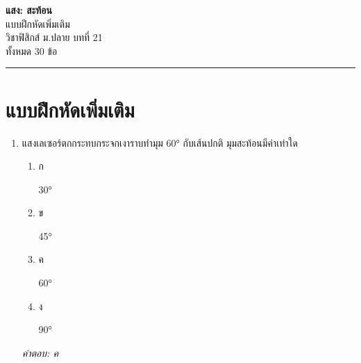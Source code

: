 \documentclass[12pt]{article}
\begin{document}
\begin{center}
{\Large\textbf{แสง: สะท้อน}}\\[6pt]
{\normalsize แบบฝึกหัดเพิ่มเติม}\\[6pt]
{\normalsize วิชาฟิสิกส์ ม.ปลาย บทที่ 21}\\[4pt]
{\footnotesize ทั้งหมด 30 ข้อ}
\end{center}
\hrule
\bigskip

\section*{แบบฝึกหัดเพิ่มเติม}
\begin{enumerate}[label=\arabic*., itemsep=0.5\baselineskip, topsep=0.5\baselineskip, leftmargin=*]
\item แสงเลเซอร์ตกกระทบกระจกเงาราบทำมุม 60° กับเส้นปกติ มุมสะท้อนมีค่าเท่าใด
\begin{enumerate}[label=\alph*)., itemsep=0.3\baselineskip, topsep=0.3\baselineskip]
\item ก\ 
\begin{minipage}[t]{0.9\linewidth}
\raggedright 30°
\end{minipage}
\item ข\ 
\begin{minipage}[t]{0.9\linewidth}
\raggedright 45°
\end{minipage}
\item ค\ 
\begin{minipage}[t]{0.9\linewidth}
\raggedright 60°
\end{minipage}
\item ง\ 
\begin{minipage}[t]{0.9\linewidth}
\raggedright 90°
\end{minipage}
\end{enumerate}
\vspace{-0.3\baselineskip}
\begin{small}
\textit{คำตอบ: ค}
\end{small}


\end{enumerate}
\end{document}

